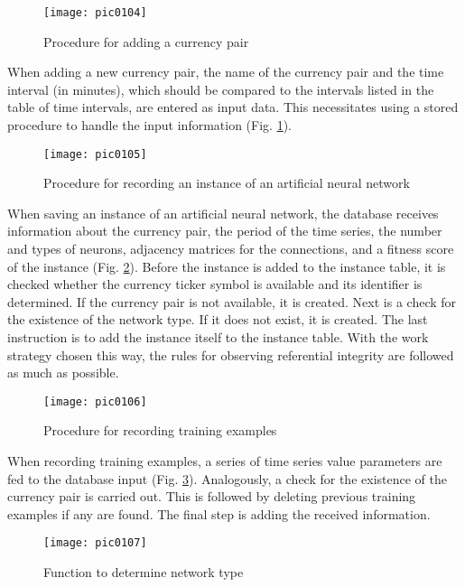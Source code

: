 \begin{figure}[h]
\centering
\texttt{[image: pic0104]}
\caption{Procedure for adding a currency pair}
\label{fig:pic0104}
\end{figure}
\FloatBarrier

When adding a new currency pair, the name of the currency pair and the time interval (in minutes), which should be compared to the intervals listed in the table of time intervals, are entered as input data. This necessitates using a stored procedure to handle the input information (Fig. \ref{fig:pic0104}).

\begin{figure}[h]
\centering
\texttt{[image: pic0105]}
\caption{Procedure for recording an instance of an artificial neural network}
\label{fig:pic0105}
\end{figure}
\FloatBarrier

When saving an instance of an artificial neural network, the database receives information about the currency pair, the period of the time series, the number and types of neurons, adjacency matrices for the connections, and a fitness score of the instance (Fig. \ref{fig:pic0105}). Before the instance is added to the instance table, it is checked whether the currency ticker symbol is available and its identifier is determined. If the currency pair is not available, it is created. Next is a check for the existence of the network type. If it does not exist, it is created. The last instruction is to add the instance itself to the instance table. With the work strategy chosen this way, the rules for observing referential integrity are followed as much as possible.

\begin{figure}[h]
\centering
\texttt{[image: pic0106]}
\caption{Procedure for recording training examples}
\label{fig:pic0106}
\end{figure}
\FloatBarrier

When recording training examples, a series of time series value parameters are fed to the database input (Fig. \ref{fig:pic0106}). Analogously, a check for the existence of the currency pair is carried out. This is followed by deleting previous training examples if any are found. The final step is adding the received information.

\begin{figure}[h]
\centering
\texttt{[image: pic0107]}
\caption{Function to determine network type}
\label{fig:pic0107}
\end{figure}
\FloatBarrier

